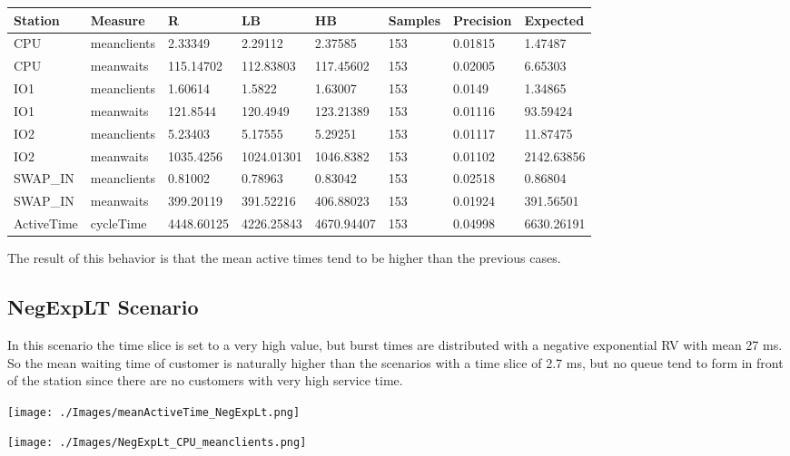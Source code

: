 \documentclass[12pt,a4paper]{article}
\begin{document}
\begin{table}[!ht]
    \centering
    \begin{tabular}{|l|l|l|l|l|l|l|l|}
    \hline
        Station & Measure & R & LB & HB & Samples & Precision & Expected \\ \hline
        CPU & meanclients & 2.33349 & 2.29112 & 2.37585 & 153 & 0.01815 & 1.47487 \\ \hline
        CPU & meanwaits & 115.14702 & 112.83803 & 117.45602 & 153 & 0.02005 & 6.65303 \\ \hline
        IO1 & meanclients & 1.60614 & 1.5822 & 1.63007 & 153 & 0.0149 & 1.34865 \\ \hline
        IO1 & meanwaits & 121.8544 & 120.4949 & 123.21389 & 153 & 0.01116 & 93.59424 \\ \hline
        IO2 & meanclients & 5.23403 & 5.17555 & 5.29251 & 153 & 0.01117 & 11.87475 \\ \hline
        IO2 & meanwaits & 1035.4256 & 1024.01301 & 1046.8382 & 153 & 0.01102 & 2142.63856 \\ \hline
        SWAP\_IN & meanclients & 0.81002 & 0.78963 & 0.83042 & 153 & 0.02518 & 0.86804 \\ \hline
        SWAP\_IN & meanwaits & 399.20119 & 391.52216 & 406.88023 & 153 & 0.01924 & 391.56501 \\ \hline
        ActiveTime & cycleTime & 4448.60125 & 4226.25843 & 4670.94407 & 153 & 0.04998 & 6630.26191 \\ \hline
    \end{tabular}
\end{table}

The result of this behavior is that the mean active times tend to be higher than the previous cases.

\subsection{NegExpLT Scenario}

In this scenario the time slice is set to a very high value, but burst times are distributed with a negative exponential RV with mean 27 ms. So the mean waiting time of customer is naturally higher than the scenarios with a time slice of 2.7 ms, but no queue tend to form in front of the station since there are no customers with very high service time.

\texttt{[image: ./Images/meanActiveTime\_NegExpLt.png]}

\texttt{[image: ./Images/NegExpLt\_CPU\_meanclients.png]}
\end{document}
